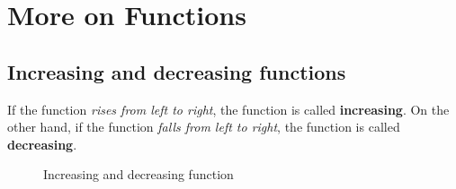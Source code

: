 \chapter{More on Functions}
\section{Increasing and decreasing functions}
If the function \textit{rises from left to right}, the function is called \textbf{increasing}. On the other hand, if the function \textit{falls from left to right}, the function is called \textbf{decreasing}.
\begin{figure}[ht]
    \centering
    \qquad
    \caption{Increasing and decreasing function}%
    \label{fig:inc_dec}%
\end{figure}


